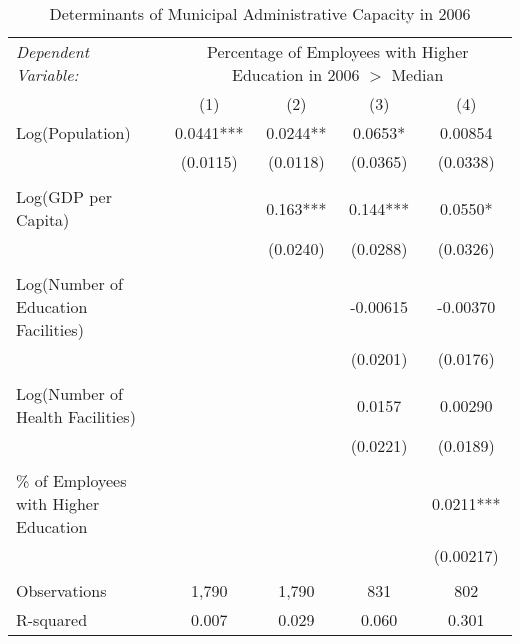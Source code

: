 \documentclass[]{article}
\begin{document}
\begin{table}[ht!]
\centering
\caption{Determinants of Municipal Administrative Capacity in 2006}
\begin{adjustbox}{max width=\textwidth}
\begin{tabular}{lcccc}
\toprule
 \textit{Dependent Variable:} & \multicolumn{4}{c}{Percentage of Employees with Higher Education in 2006 $>$ Median} \\ 
\cmidrule(lr){2-5}
& (1) & (2) & (3) & (4) \\ 
\midrule
Log(Population) & 0.0441*** & 0.0244** & 0.0653* & 0.00854 \\ 
                & (0.0115) & (0.0118) & (0.0365) & (0.0338) \\ 
                &          &          &          &          \\
Log(GDP per Capita) &  & 0.163*** & 0.144*** & 0.0550* \\ 
                    &  & (0.0240) & (0.0288) & (0.0326) \\ 
                    &  &          &          &          \\
Log(Number of Education Facilities) &  &  & -0.00615 & -0.00370 \\ 
                                    &  &  & (0.0201) & (0.0176) \\ 
                                    &  &  &          &          \\
Log(Number of Health Facilities) &  &  & 0.0157 & 0.00290 \\ 
                                 &  &  & (0.0221) & (0.0189) \\ 
                                 &  &  &          &          \\
\% of Employees with Higher Education &  &  &  & 0.0211*** \\ 
                                                     &  &  &  & (0.00217) \\ 
                                                     &  &  &  &          \\
\midrule
Observations & 1,790 & 1,790 & 831 & 802 \\ 
R-squared & 0.007 & 0.029 & 0.060 & 0.301 \\ 
\bottomrule
\end{tabular}
\end{adjustbox}
\end{table}
\end{document}

